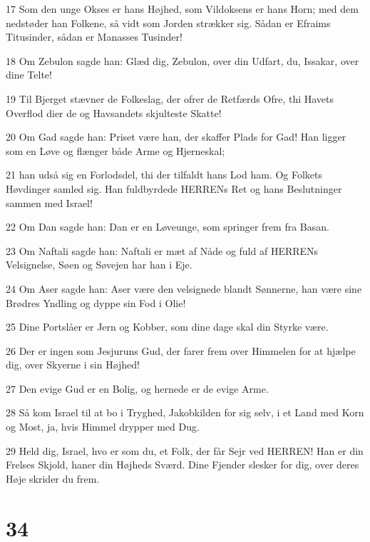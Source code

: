 \par 17 Som den unge Okses er hans Højhed, som Vildoksens er hans Horn; med dem nedstøder han Folkene, så vidt som Jorden strækker sig. Sådan er Efraims Titusinder, sådan er Manasses Tusinder!
\par 18 Om Zebulon sagde han: Glæd dig, Zebulon, over din Udfart, du, Issakar, over dine Telte!
\par 19 Til Bjerget stævner de Folkeslag, der ofrer de Retfærds Ofre, thi Havets Overflod dier de og Havsandets skjulteste Skatte!
\par 20 Om Gad sagde han: Priset være han, der skaffer Plads for Gad! Han ligger som en Løve og flænger både Arme og Hjerneskal;
\par 21 han udså sig en Forlodsdel, thi der tilfaldt hans Lod ham. Og Folkets Høvdinger samled sig. Han fuldbyrdede HERRENs Ret og hans Beslutninger sammen med Israel!
\par 22 Om Dan sagde han: Dan er en Løveunge, som springer frem fra Basan.
\par 23 Om Naftali sagde han: Naftali er mæt af Nåde og fuld af HERRENs Velsignelse, Søen og Søvejen har han i Eje.
\par 24 Om Aser sagde han: Aser være den velsignede blandt Sønnerne, han være sine Brødres Yndling og dyppe sin Fod i Olie!
\par 25 Dine Portslåer er Jern og Kobber, som dine dage skal din Styrke være.
\par 26 Der er ingen som Jesjuruns Gud, der farer frem over Himmelen for at hjælpe dig, over Skyerne i sin Højhed!
\par 27 Den evige Gud er en Bolig, og hernede er de evige Arme.
\par 28 Så kom Israel til at bo i Tryghed, Jakobkilden for sig selv, i et Land med Korn og Most, ja, hvis Himmel drypper med Dug.
\par 29 Held dig, Israel, hvo er som du, et Folk, der får Sejr ved HERREN! Han er din Frelses Skjold, haner din Højheds Sværd. Dine Fjender slesker for dig, over deres Høje skrider du frem.

\chapter{34}

